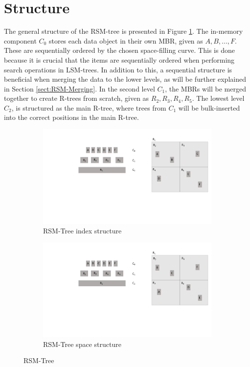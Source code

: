 \section{Structure}
The general structure of the RSM-tree is presented in Figure \ref{fig:RSMTree}. The in-memory component $C_0$ stores each data object in their own MBR, given as $A, B, ..., F$. These are sequentially ordered by the chosen space-filling curve. This is done because it is crucial that the items are sequentially ordered when performing search operations in LSM-trees. In addition to this, a sequential structure is beneficial when merging the data to the lower levels, as will be further explained in Section \ref{sect:RSM-Merging}. In the second level $C_1$, the MBRs will be merged together to create R-trees from scratch, given as $R_2, R_3, R_4, R_5$. The lowest level $C_2$, is structured as the main R-tree, where trees from $C_1$ will be bulk-inserted into the correct positions in the main R-tree.  
\begin{figure}[ht]
     \centering
     \begin{subfigure}{0.45\textwidth}
         \centering
         \includegraphics[width=\textwidth]{figures/RSMTree.pdf}
         \caption{RSM-Tree index structure}
     \end{subfigure}
     \hfill
     \begin{subfigure}{0.45\textwidth}
         \centering
         \includegraphics[width=\textwidth]{figures/RSMTree_space.pdf}
         \caption{RSM-Tree space structure}
     \end{subfigure}
        \caption{RSM-Tree}
        \label{fig:RSMTree}
\end{figure}


